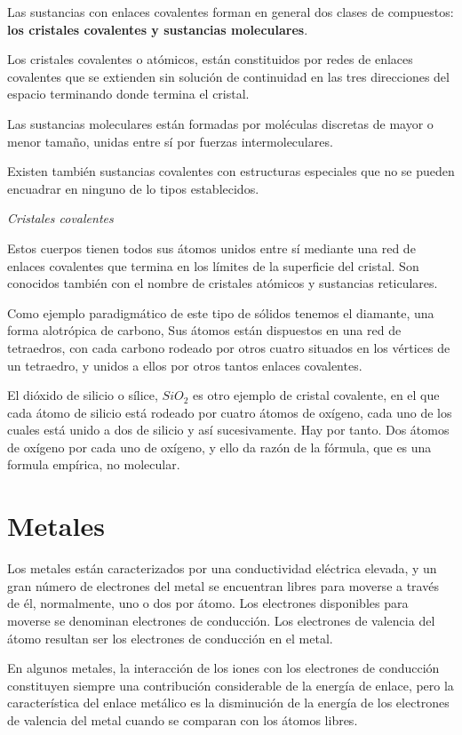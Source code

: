 \documentclass{article}
\begin{document}
Las sustancias con enlaces covalentes forman en general dos clases de compuestos: \textbf{los cristales covalentes y sustancias moleculares}. 

Los cristales covalentes o atómicos, están constituidos por redes de enlaces covalentes que se extienden sin solución de continuidad en las tres direcciones del espacio terminando donde termina el cristal.

Las sustancias moleculares están formadas por moléculas discretas de mayor o menor tamaño, unidas entre sí por fuerzas intermoleculares.

Existen también sustancias covalentes con estructuras especiales que no se pueden encuadrar en ninguno de lo tipos establecidos.

\textit{Cristales covalentes} 

Estos cuerpos tienen todos sus átomos unidos entre sí mediante una red de enlaces covalentes que termina en los límites de la superficie del cristal. Son conocidos también con el nombre de cristales atómicos y sustancias reticulares.

Como ejemplo paradigmático de este tipo de sólidos tenemos el diamante, una forma alotrópica de carbono, Sus átomos están dispuestos en una red de tetraedros, con cada carbono rodeado por otros cuatro situados en los vértices de un tetraedro, y unidos a ellos por otros tantos enlaces covalentes.

El dióxido de silicio o sílice, $SiO_2$ es otro ejemplo de cristal covalente, en el que cada átomo de silicio está rodeado por cuatro átomos de oxígeno, cada uno de los cuales está unido a dos de silicio y así sucesivamente. Hay por tanto. Dos átomos de oxígeno por cada uno de oxígeno, y ello da razón de la fórmula, que es una formula empírica, no molecular. 


\newpage
\newpage

\section{Metales}

Los metales están caracterizados por una conductividad eléctrica elevada, y un gran número de electrones del metal se encuentran libres para moverse a través de él, normalmente, uno o dos por átomo. Los electrones disponibles para moverse se denominan electrones de conducción. Los electrones de valencia del átomo resultan ser los electrones de conducción en el metal. \cite{Kittel}

En algunos metales, la interacción de los iones con los electrones de conducción constituyen siempre una contribución considerable de la energía de enlace, pero la característica del enlace metálico es la disminución de la energía de los electrones de valencia del metal cuando se comparan con los átomos libres. 
\end{document}
